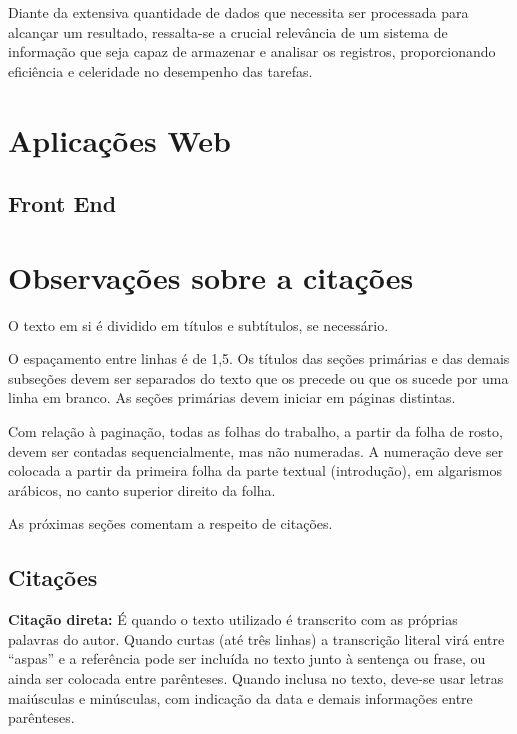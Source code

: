 Diante da extensiva quantidade de dados que necessita ser processada para alcançar um resultado, ressalta-se a crucial relevância de um sistema de informação que seja capaz de armazenar e analisar os registros, proporcionando eficiência e celeridade no desempenho das tarefas.

\section{Aplicações Web}\label{sec:aplicacoesWeb}

\subsection{Front End}\label{sec:frontEnd}


\section{Observações sobre a citações}\label{sec:formatacaoTexto}

O texto em si é dividido em títulos e subtítulos, se necessário.

O espaçamento entre linhas é de 1,5. Os títulos das seções primárias e das demais subseções devem ser separados do texto que os precede ou que os sucede por uma linha em branco. As seções primárias devem iniciar em páginas distintas.

Com relação à paginação, todas as folhas do trabalho, a partir da folha de rosto, devem ser contadas sequencialmente, mas não numeradas. A numeração deve ser colocada a partir da primeira folha da parte textual (introdução), em algarismos arábicos, no canto superior direito da folha.


As próximas seções comentam a respeito de citações.

\subsection{Citações}\label{subsec:citacoes}

\textbf{Citação direta:} É quando o texto utilizado é transcrito com as próprias palavras do autor. Quando curtas (até três linhas) a transcrição literal virá entre “aspas” e a referência pode ser incluída no texto junto à sentença ou frase, ou ainda ser colocada entre parênteses. Quando inclusa no texto, deve-se usar letras maiúsculas e minúsculas, com indicação da data e demais informações entre parênteses.

